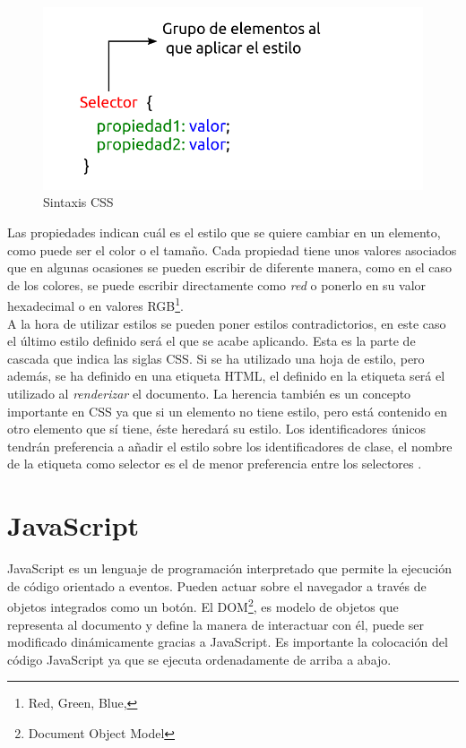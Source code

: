 \begin{figure}[H]
    \centering
    \includegraphics[width=12cm, keepaspectratio]{img/css.png}
    \caption{Sintaxis CSS}
    \label{fig:css}
\end{figure}
\newpage
Las propiedades indican cuál es el estilo que se quiere cambiar en un elemento, como puede ser el color o el tamaño. Cada propiedad tiene unos valores asociados que en algunas ocasiones se pueden escribir de diferente manera, como en el caso de los colores, se puede escribir directamente como \textit{red} o ponerlo en su valor hexadecimal o en valores RGB\footnote{ Red, Green, Blue,}.\\

A la hora de utilizar estilos se pueden poner estilos contradictorios, en este caso el último estilo definido será el que se acabe aplicando. Esta es la parte de cascada que indica las siglas CSS. Si se ha utilizado una hoja de estilo, pero además, se ha definido en una etiqueta HTML, el definido en la etiqueta será el utilizado al \textit{renderizar} el documento. La herencia también es un concepto importante en CSS ya que si un elemento no tiene estilo, pero está contenido en otro elemento que sí tiene, éste heredará su estilo. Los identificadores únicos tendrán preferencia a añadir el estilo sobre los identificadores de clase, el nombre de la etiqueta como selector es el de menor preferencia entre los selectores \cite{juan3}.


\section{JavaScript}
JavaScript es un lenguaje de programación interpretado que permite la ejecución de código orientado a eventos. Pueden actuar sobre el navegador a través de objetos integrados como un botón. El DOM\footnote{Document Object Model}, es modelo de objetos que representa al documento y define la manera de interactuar con él, puede ser modificado dinámicamente gracias a JavaScript. Es importante la colocación del código JavaScript ya que se ejecuta ordenadamente de arriba a abajo. \\

